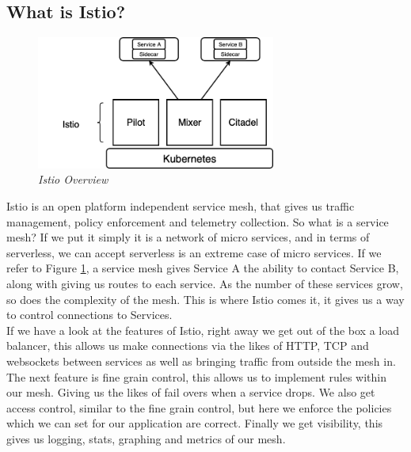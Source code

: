 \subsection{What is Istio?}
\label{sub:istio}
\begin{figure}[!ht]
\centering
\includegraphics*[width=0.7\textwidth]{images/istio.png}
\caption{\em Istio Overview}
\label{img:istio}
\end{figure}
Istio is an open platform independent service mesh, that gives us traffic management, policy enforcement and telemetry collection. So what is a service mesh? If we put it simply it is a network of micro services, and in terms of serverless, we can accept serverless is an extreme case of micro services. If we refer to Figure \ref{img:istio}, a service mesh gives Service A the ability to contact Service B, along with giving us routes to each service. As the number of these services grow, so does the complexity of the mesh. This is where Istio comes it, it gives us a way to control connections to Services. 
\\If we have a look at the features of Istio, right away we get out of the box a load balancer, this allows us make connections via the likes of HTTP, TCP and websockets between services as well as bringing traffic from outside the mesh in. The next feature is fine grain control, this allows us to implement rules within our mesh. Giving us the likes of fail overs when a service drops. We also get access control, similar to the fine grain control, but here we enforce the policies which we can set for our application are correct. Finally we get visibility, this gives us logging, stats, graphing and metrics of our mesh.
